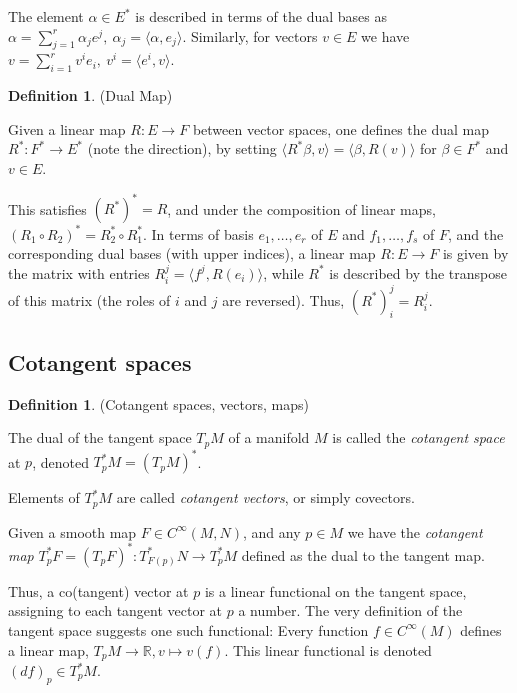 \documentclass{article}
\theoremstyle{definition}
\newtheorem{defn}[theorem]{Definition}
\newenvironment{definition}
  {\vspace{8pt}\begin{mdframed}[backgroundcolor=blueish,innertopmargin=4]\begin{defn}}
  {\end{defn}\end{mdframed}\vspace{4pt}}
\begin{document}
The element $\alpha \in E^*$ is described in terms of the dual bases as $\alpha = \sum_{j=1}^r \alpha_j e^j, \  \alpha_j = \langle \alpha, e_j \rangle$. Similarly, for vectors $v \in E$ we have $v = \sum_{i=1}^r v^i e_i, \ v^i = \langle e^i , v \rangle$.

\begin{definition} (Dual Map)

Given a linear map $R : E \rightarrow F$ between vector spaces, one defines the dual map $R^* : F^* \rightarrow E^*$ (note the direction), by setting $\langle R^* \beta, v \rangle = \langle \beta ,R(v)\rangle$ for $\beta \in F^*$ and $v \in E$. 
\end{definition}

This satisfies $(R^*)^* = R$, and under the composition of linear maps, $(R_1 \circ R_2)^* = R^*_2 \circ R^*_1$. In terms of basis $e_1,\dots, e_r$ of $E$ and $f_1,\dots, f_s$ of $F$, and the corresponding dual bases (with upper indices), a linear map $R : E \rightarrow F$ is given by the matrix with entries $R_i^j = \langle f^j , R(e_i)\rangle$, while $R^*$ is described by the transpose of this matrix (the roles of $i$ and $j$ are reversed). Thus, $(R^*)^j_i = R_i^j$.

\subsection{Cotangent spaces}

\begin{definition} (Cotangent spaces, vectors, maps)

The dual of the tangent space $T_pM$ of a manifold $M$ is called the \textit{cotangent space} at $p$, denoted $T^*_p M = (T_pM)^*$.

Elements of $T^*_p M$ are called \textit{cotangent vectors}, or simply covectors. 

Given a smooth map $F \in C^\infty(M, N)$, and any $p \in M$ we have the \textit{cotangent map} $T^*_p F = (T_pF)^* : T^*_{F(p)}N \rightarrow T^*_p M$ defined as the dual to the tangent map.

\end{definition}

Thus, a co(tangent) vector at $p$ is a linear functional on the tangent space, assigning to each tangent vector at $p$ a number. The very definition of the tangent space suggests one such functional: Every function $f \in C^\infty(M)$ defines a linear map, $T_pM \rightarrow \mathbb R, v \mapsto v(f)$. This linear functional is denoted $(d f)_p \in T^*_p M$.
\end{document}
